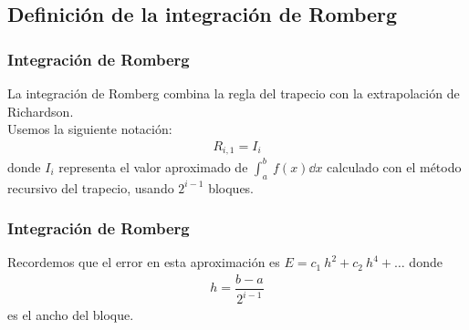 \subsection{Definición de la integración de Romberg}
\begin{frame}
\frametitle{Integración de Romberg}
La integración de Romberg combina la regla del trapecio con la extrapolación de Richardson. 
\\
\bigskip
Usemos la siguiente notación:
\begin{align*}
R_{i, 1} = I_{i}
\end{align*}
donde $I_{i}$ representa el valor aproximado de $\int_{a}^{b} \: f(x) \dd{x}$ calculado con el método recursivo del trapecio, usando $2^{i - 1}$ bloques.
\end{frame}
\begin{frame}
\frametitle{Integración de Romberg}
Recordemos que el error en esta aproximación es $E = c_{1} \: h^{2} + c_{2} \: h^{4} + \ldots$ donde
\begin{align*}
h = \dfrac{b - a}{2^{i - 1}}
\end{align*}
es el ancho del bloque.
\end{frame}
